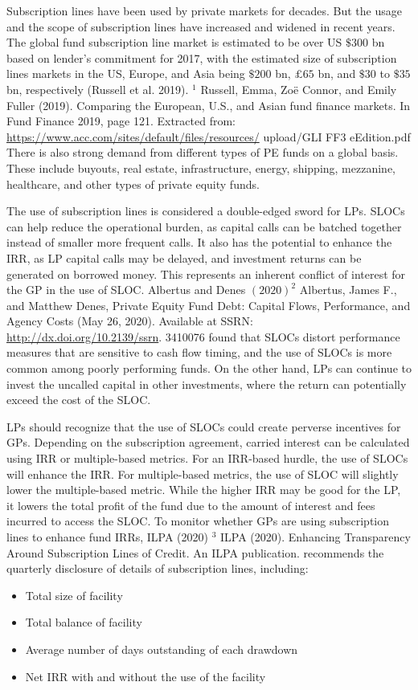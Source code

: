 \documentclass[11pt]{article}
\begin{document}
Subscription lines have been used by private markets for decades. But the usage and the scope of subscription lines have increased and widened in recent years. The global fund subscription line market is estimated to be over US $\$ 300$ bn based on lender's commitment for 2017, with the estimated size of subscription lines markets in the US, Europe, and Asia being $\$ 200$ bn, $\pounds 65$ bn, and $\$ 30$ to $\$ 35$ bn, respectively (Russell et al. 2019). ${ }^{1}$ Russell, Emma, Zoë Connor, and Emily Fuller (2019). Comparing the European, U.S., and Asian fund finance markets. In Fund Finance 2019, page 121. Extracted from: \href{https://www.acc.com/sites/default/files/resources/}{https://www.acc.com/sites/default/files/resources/} upload/GLI FF3 eEdition.pdf There is also strong demand from different types of PE funds on a global basis. These include buyouts, real estate, infrastructure, energy, shipping, mezzanine, healthcare, and other types of private equity funds.

The use of subscription lines is considered a double-edged sword for LPs. SLOCs can help reduce the operational burden, as capital calls can be batched together instead of smaller more frequent calls. It also has the potential to enhance the IRR, as LP capital calls may be delayed, and investment returns can be generated on borrowed money. This represents an inherent conflict of interest for the GP in the use of SLOC. Albertus and Denes $(2020)^{2}$ Albertus, James F., and Matthew Denes, Private Equity Fund Debt: Capital Flows, Performance, and Agency Costs (May 26, 2020). Available at SSRN: \href{http://dx.doi.org/10.2139/ssrn}{http://dx.doi.org/10.2139/ssrn}. 3410076 found that SLOCs distort performance measures that are sensitive to cash flow timing, and the use of SLOCs is more common among poorly performing funds. On the other hand, LPs can continue to invest the uncalled capital in other investments, where the return can potentially exceed the cost of the SLOC.

LPs should recognize that the use of SLOCs could create perverse incentives for GPs. Depending on the subscription agreement, carried interest can be calculated using IRR or multiple-based metrics. For an IRR-based hurdle, the use of SLOCs will enhance the IRR. For multiple-based metrics, the use of SLOC will slightly lower the multiple-based metric. While the higher IRR may be good for the LP, it lowers the total profit of the fund due to the amount of interest and fees incurred to access the SLOC. To monitor whether GPs are using subscription lines to enhance fund IRRs, ILPA (2020) ${ }^{3}$ ILPA (2020). Enhancing Transparency Around Subscription Lines of Credit. An ILPA publication. recommends the quarterly disclosure of details of subscription lines, including:

\begin{itemize}
  \item Total size of facility
  \item Total balance of facility
  \item Average number of days outstanding of each drawdown
  \item Net IRR with and without the use of the facility
\end{itemize}
\end{document}
